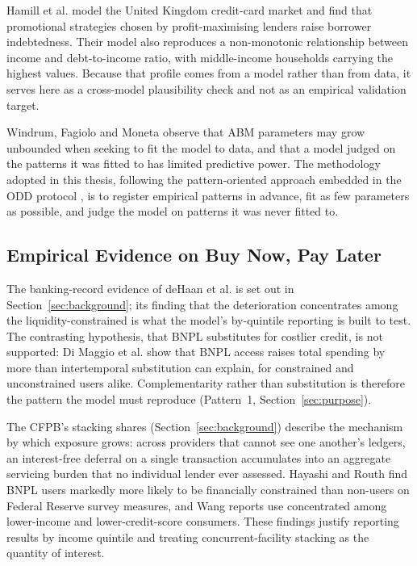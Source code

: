 Hamill et al. \cite{hamill2023creditcard} model the United Kingdom credit-card market and find
that promotional strategies chosen by profit-maximising lenders raise borrower indebtedness. Their
model also reproduces a non-monotonic relationship between income and debt-to-income ratio, with
middle-income households carrying the highest values. Because that profile comes from a model
rather than from data, it serves here as a cross-model plausibility check and not as an empirical
validation target.

Windrum, Fagiolo and Moneta \cite{windrum2007validation}
observe that \ac{ABM} parameters may grow unbounded when seeking to fit the model to data, and that a model
judged on the patterns it was fitted to has limited predictive power. The methodology adopted in this thesis,
following the pattern-oriented approach embedded in the \ac{ODD} protocol \cite{grimm2020odd,grimm2006odd}, is
to register empirical patterns in advance, fit as few parameters as possible, and judge the model
on patterns it was never fitted to.

\subsection{Empirical Evidence on Buy Now, Pay Later}
\label{sec:lit-bnpl}
The banking-record evidence of deHaan et al. \cite{dehaan2024bnpl} is set out in
Section~\ref{sec:background}; its finding that the deterioration concentrates among the
liquidity-constrained is what the model's by-quintile reporting is built to test. The contrasting
hypothesis, that \ac{BNPL} substitutes for costlier credit, is not supported: Di Maggio et al.
\cite{dimaggio2022bnpl} show that \ac{BNPL} access raises total spending by more than
intertemporal substitution can explain, for constrained and unconstrained users alike.
Complementarity rather than substitution is therefore the pattern the model must reproduce
(Pattern~1, Section~\ref{sec:purpose}).

The \ac{CFPB}'s stacking shares (Section~\ref{sec:background}) describe the mechanism by which
exposure grows: across providers that cannot see one another's ledgers, an interest-free deferral
on a single transaction accumulates into an aggregate servicing burden that no individual lender
ever assessed. Hayashi and Routh \cite{hayashi2025constraints} find \ac{BNPL} users markedly more
likely to be financially constrained than non-users on Federal Reserve survey measures, and Wang
\cite{wang2026buynow} reports use concentrated among lower-income and lower-credit-score
consumers. These findings justify reporting results by income quintile and treating
concurrent-facility stacking as the quantity of interest.

